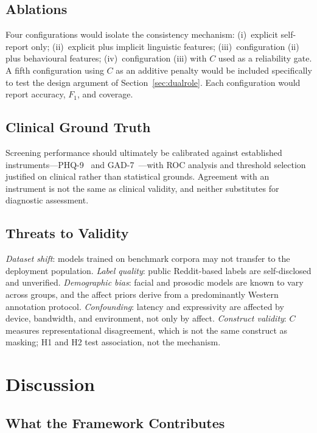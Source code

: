 \documentclass[12pt]{article}
\begin{document}
\subsection{Ablations}

Four configurations would isolate the consistency mechanism:
(i)~explicit self-report only; (ii)~explicit plus implicit linguistic
features; (iii)~configuration (ii) plus behavioural features;
(iv)~configuration (iii) with $C$ used as a reliability gate. A fifth
configuration using $C$ as an additive penalty would be included
specifically to test the design argument of Section~\ref{sec:dualrole}.
Each configuration would report accuracy, $F_1$, and coverage.

\subsection{Clinical Ground Truth}

Screening performance should ultimately be calibrated against
established instruments---PHQ-9~\cite{kroenke2001phq9} and
GAD-7~\cite{spitzer2006gad7}---with ROC analysis and threshold selection
justified on clinical rather than statistical grounds. Agreement with an
instrument is not the same as clinical validity, and neither substitutes
for diagnostic assessment.

\subsection{Threats to Validity}

\emph{Dataset shift}: models trained on benchmark corpora may not
transfer to the deployment population. \emph{Label quality}: public
Reddit-based labels are self-disclosed and unverified.
\emph{Demographic bias}: facial and prosodic models are known to vary
across groups, and the affect priors derive from a predominantly Western
annotation protocol. \emph{Confounding}: latency and expressivity are
affected by device, bandwidth, and environment, not only by affect.
\emph{Construct validity}: $C$ measures representational disagreement,
which is not the same construct as masking; H1 and H2 test association,
not the mechanism.

\section{Discussion}

\subsection{What the Framework Contributes}
\end{document}
